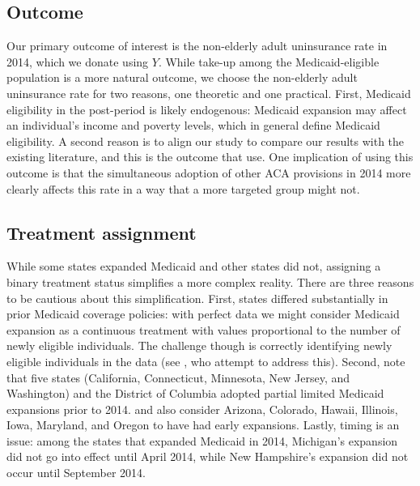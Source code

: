 \documentclass[12pt]{article}
\begin{document}
\subsection{Outcome}

Our primary outcome of interest is the non-elderly adult uninsurance rate in 2014, which we donate using $Y$. While take-up among the Medicaid-eligible population is a more natural outcome, we choose the non-elderly adult uninsurance rate for two reasons, one theoretic and one practical. First, Medicaid eligibility in the post-period is likely endogenous: Medicaid expansion may affect an individual's income and poverty levels, which in general define Medicaid eligibility. A second reason is to align our study to compare our results with the existing literature, and this is the outcome that \cite{courtemanche2017early} use. One implication of using this outcome is that the simultaneous adoption of other ACA provisions in 2014 more clearly affects this rate in a way that a more targeted group might not.

\subsection{Treatment assignment} \label{sssec:txassign}

While some states expanded Medicaid and other states did not, assigning a binary treatment status simplifies a more complex reality. There are three reasons to be cautious about this simplification. First, states differed substantially in prior Medicaid coverage policies: with perfect data we might consider Medicaid expansion as a continuous treatment with values proportional to the number of newly eligible individuals. The challenge though is correctly identifying newly eligible individuals in the data (see \cite{frean2017premium}, who attempt to address this). Second, \cite{frean2017premium} note that five states (California, Connecticut, Minnesota, New Jersey, and Washington) and the District of Columbia adopted partial limited Medicaid expansions prior to 2014. \cite{kaestner2017effects} and \cite{courtemanche2017early} also consider Arizona, Colorado, Hawaii, Illinois, Iowa, Maryland, and Oregon to have had early expansions. Lastly, timing is an issue: among the states that expanded Medicaid in 2014, Michigan's expansion did not go into effect until April 2014, while New Hampshire's expansion did not occur until September 2014.
\end{document}
